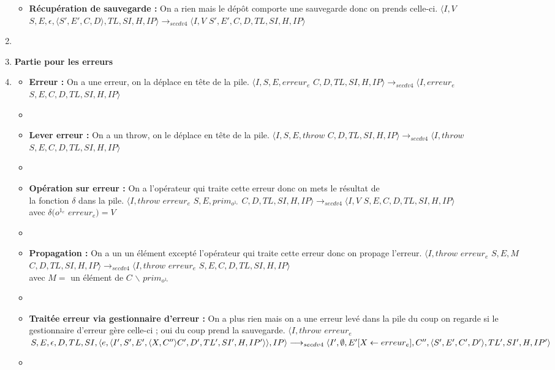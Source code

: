 \documentclass[10pt,a4paper]{article}
\begin{document}
\begin{enumerate}
\begin{itemize}
						\item[] \textbf{Récupération de sauvegarde :}  On a rien mais le dépôt comporte une sauvegarde donc on prends celle-ci.
						\smallbreak  
						$\langle I,V$ $S,E,\epsilon,\langle S',E',C,D\rangle,TL,SI,H,IP\rangle
						\longrightarrow_{secdv4} \langle I,V$ $S',E',C,D,TL,SI,H,IP\rangle$
					\end{itemize}
					\item[]
					\item[] \textbf{Partie pour les erreurs} 
					\item[]
					\begin{itemize}
						\item[] \textbf{Erreur :} On a une erreur, on la déplace en tête de la pile.
						\smallbreak
						$\langle I,S,E,erreur_{e}$ $C,D,TL,SI,H,IP\rangle
						\longrightarrow_{secdv4} \langle I,erreur_{e}$ $S,E,C,D,TL,SI,H,IP\rangle$
						\item[]
							
						\item[] \textbf{Lever erreur :} On a un throw, on le déplace en tête de la pile.
						\smallbreak
						$\langle I,S,E,throw$ $C,D,TL,SI,H,IP\rangle
						\longrightarrow_{secdv4} \langle I,throw$ $S,E,C,D,TL,SI,H,IP\rangle$
						\item[]
							
						\item[] \textbf{Opération sur erreur :} On a l'opérateur qui traite cette erreur donc on mets le résultat de 
						\\la fonction $\delta$ dans la pile.
						\smallbreak
						$\langle I,throw$ $erreur_{e}$ $S,E,prim_{o^{1_{e}}}$ $C,D,TL,SI,H,IP\rangle
						\longrightarrow_{secdv4} \langle I,V$ $S,E,C,D,TL,SI,H,IP\rangle$
						\\ avec $\delta(o^{1_{e}}$ $erreur_{e}) = V$
						\item[]
							
						\item[] \textbf{Propagation :} On a un un élément excepté l'opérateur qui traite cette erreur donc on propage l'erreur.
						\smallbreak
						$\langle I,throw$ $erreur_{e}$ $S,E,M$ $C,D,TL,SI,H,IP\rangle
						\longrightarrow_{secdv4} \langle I,throw$ $erreur_{e}$ $S,E,C,D,TL,SI,H,IP\rangle$ 
						\\avec $M = $ un élément de $C$ $\backslash$ $prim_{o^{1_{e}}}$
						\item[]
							
						\item[] \textbf{Traitée erreur via gestionnaire d'erreur :} On a plus rien mais on a une erreur levé dans la pile du coup on regarde si le gestionnaire d'erreur gère celle-ci ; oui du coup prend la sauvegarde.
						\smallbreak 
						$\langle I,throw$ $erreur_{e}$ $S,E,\epsilon,D,TL,SI,\langle e,\langle I',S',E',\langle X,C'' \rangle C',D',TL',SI',H,IP'\rangle\rangle,IP\rangle \\\longrightarrow_{secdv4} \langle I',\emptyset,E'[X \leftarrow erreur_{e}],C'',\langle S',E',C',D'\rangle,TL',SI',H,IP'\rangle$
						\item[]
						

\end{itemize}
\end{enumerate}
\end{document}
